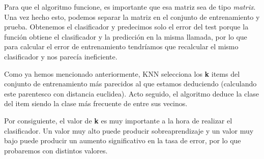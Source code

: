 \documentclass[spanish,]{article}
\begin{document}
Para que el algoritmo funcione, es importante que esa matriz sea de tipo
\emph{matrix}. Una vez hecho esto, podemos separar la matriz en el
conjunto de entrenamiento y prueba. Obtenemos el clasificador y
predecimos solo el error del test porque la función obtiene el
clasificador y la predicción en la misma llamada, por lo que para
calcular el error de entrenamiento tendríamos que recalcular el mismo
clasificador y nos parecía ineficiente.

Como ya hemos mencionado anteriormente, KNN selecciona los \textbf{k}
items del conjunto de entrenamiento más parecidos al que estamos
deduciendo (calculando este parentesco con distancia euclidea). Acto
seguido, el algoritmo deduce la clase del item siendo la clase más
frecuente de entre sus vecinos.

Por consiguiente, el valor de \textbf{k} es muy importante a la hora de
realizar el clasificador. Un valor muy alto puede producir
sobreaprendizaje y un valor muy bajo puede producir un aumento
significativo en la tasa de error, por lo que probaremos con distintos
valores.
\end{document}

